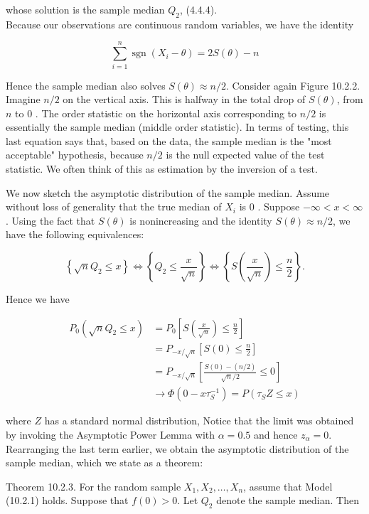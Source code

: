 whose solution is the sample median $Q_{2}$, (4.4.4).\\
Because our observations are continuous random variables, we have the identity

$$
\sum_{i=1}^{n} \operatorname{sgn}\left(X_{i}-\theta\right)=2 S(\theta)-n
$$

Hence the sample median also solves $S(\theta) \approx n / 2$. Consider again Figure 10.2.2. Imagine $n / 2$ on the vertical axis. This is halfway in the total drop of $S(\theta)$, from $n$ to 0 . The order statistic on the horizontal axis corresponding to $n / 2$ is essentially the sample median (middle order statistic). In terms of testing, this last equation says that, based on the data, the sample median is the "most acceptable" hypothesis, because $n / 2$ is the null expected value of the test statistic. We often think of this as estimation by the inversion of a test.

We now sketch the asymptotic distribution of the sample median. Assume without loss of generality that the true median of $X_{i}$ is 0 . Suppose $-\infty<x<\infty$. Using the fact that $S(\theta)$ is nonincreasing and the identity $S(\theta) \approx n / 2$, we have the following equivalences:

$$
\left\{\sqrt{n} Q_{2} \leq x\right\} \Leftrightarrow\left\{Q_{2} \leq \frac{x}{\sqrt{n}}\right\} \Leftrightarrow\left\{S\left(\frac{x}{\sqrt{n}}\right) \leq \frac{n}{2}\right\} .
$$

Hence we have

$$
\begin{aligned}
P_{0}\left(\sqrt{n} Q_{2} \leq x\right) & =P_{0}\left[S\left(\frac{x}{\sqrt{n}}\right) \leq \frac{n}{2}\right] \\
& =P_{-x / \sqrt{n}}\left[S(0) \leq \frac{n}{2}\right] \\
& =P_{-x / \sqrt{n}}\left[\frac{S(0)-(n / 2)}{\sqrt{n} / 2} \leq 0\right] \\
& \rightarrow \Phi\left(0-x \tau_{S}^{-1}\right)=P\left(\tau_{S} Z \leq x\right)
\end{aligned}
$$

where $Z$ has a standard normal distribution, Notice that the limit was obtained by invoking the Asymptotic Power Lemma with $\alpha=0.5$ and hence $z_{\alpha}=0$. Rearranging the last term earlier, we obtain the asymptotic distribution of the sample median, which we state as a theorem:

Theorem 10.2.3. For the random sample $X_{1}, X_{2}, \ldots, X_{n}$, assume that Model (10.2.1) holds. Suppose that $f(0)>0$. Let $Q_{2}$ denote the sample median. Then


